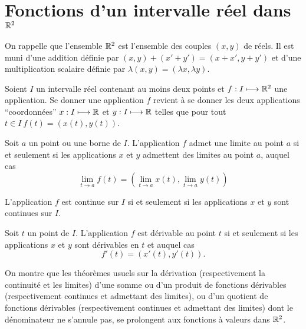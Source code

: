 \section{Fonctions d'un intervalle réel dans \(\mathbb{R}^2\)}

On rappelle que l'ensemble \(\mathbb{R}^2\) est l'ensemble des couples \((x,y)\) de réels. Il est muni d'une addition définie par \((x,y)+(x'+y') = (x+x',y+y')\) et d'une multiplication scalaire définie par \(\lambda(x,y) = (\lambda x, \lambda y)\).

Soient \(I\) un intervalle réel contenant au moins deux points et \(f : I \longmapsto \mathbb{R}^2\) une application. Se donner une application \(f\) revient à se donner les deux applications ``coordonnées'' \(x : I \longmapsto \mathbb{R}\) et \(y : I \longmapsto \mathbb{R}\) telles que pour tout \(t \in I \ f(t)=(x(t),y(t))\).

\begin{prop}
  Soit \(a\) un point ou une borne de \(I\). L'application \(f\) admet une limite au point \(a\) si et seulement si les applications \(x\) et \(y\) admettent des limites au point \(a\), auquel cas
  \begin{equation}
    \lim\limits_{t \to a} f(t) = \left(\lim\limits_{t \to a} x(t) ,\lim\limits_{t \to a} y(t)\right)
  \end{equation}
\end{prop}
\begin{prop}
  L'application \(f\) est continue sur \(I\) si et seulement si les applications \(x\) et \(y\) sont continues sur \(I\).
\end{prop}
\begin{prop}
  Soit \(t\) un point de \(I\). L'application \(f\) est dérivable au point \(t\) si et seulement si les applications \(x\) et \(y\) sont dérivables en \(t\) et auquel cas
  \begin{equation}
    f'(t) = (x'(t),y'(t)).
  \end{equation}
\end{prop}
On montre que les théorèmes usuels sur la dérivation (respectivement la continuité et les limites) d'une somme ou d'un produit de fonctions dérivables (respectivement continues et admettant des limites), ou d'un quotient de fonctions dérivables (respectivement continues et admettant des limites) dont le dénominateur ne s'annule pas, se prolongent aux fonctions à valeurs dans \(\mathbb{R}^2\).
